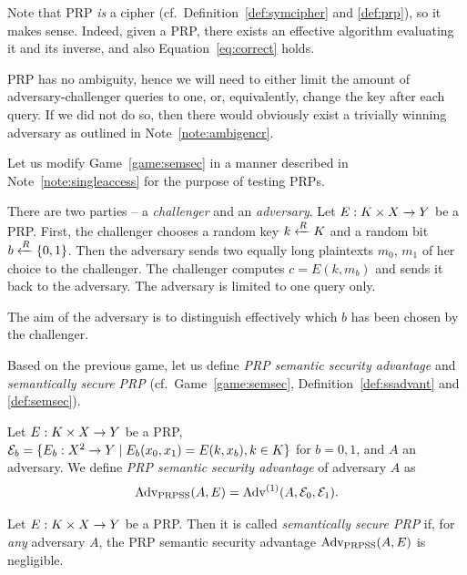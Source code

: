 Note that PRP {\em is} a cipher (cf.\ Definition~\ref{def:symcipher} and \ref{def:prp}), so it makes sense. Indeed, given a PRP, there exists an effective algorithm evaluating it and its inverse, and also Equation~\ref{eq:correct} holds.

\begin{note}   %
\label{note:singleaccess}
	PRP has no ambiguity, hence we will need to either limit the amount of adversary-challenger queries to one, or, equivalently, change the key after each query. If we did not do so, then there would obviously exist a trivially winning adversary as outlined in Note~\ref{note:ambigencr}.
\end{note}

Let us modify Game~\ref{game:semsec} in a manner described in Note~\ref{note:singleaccess} for the purpose of testing PRPs.

\begin{game}
\label{game:semsecprp}
	There are two parties -- a {\em challenger} and an {\em adversary}. Let $E:K\times X\rightarrow Y$ be a PRP. First, the challenger chooses a random key $k\xleftarrow{R} K$ and a random bit $b\xleftarrow{R}\{0,1\}$. Then the adversary sends two equally long plaintexts $m_0$, $m_1$ of her choice to the challenger. The challenger computes $c = E(k,m_b)$ and sends it back to the adversary. The adversary is limited to one query only.
	
	The aim of the adversary is to distinguish effectively which $b$ has been chosen by the challenger.
\end{game}

Based on the previous game, let us define {\em PRP semantic security advantage} and {\em semantically secure PRP} (cf.\ Game~\ref{game:semsec}, Definition~\ref{def:ssadvant} and \ref{def:semsec}). %

\begin{defn}
\label{def:prpssadvant}
	Let $E: K\times X\rightarrow Y$ be a PRP, ${\cal E}_b = \{E_b:X^2\rightarrow Y \mid E_b(x_0,x_1) = E(k,x_b), k\in K\}$ for $b=0,1$, and $A$ an adversary. We define {\em PRP semantic security advantage} of adversary $A$ as
	\[
		\operatorname*{Adv_{PRPSS}}(A,E) = {\operatorname*{Adv}}^{(1)}(A,{\cal E}_0,{\cal E}_1) .
	\]
\end{defn}

\begin{defn}
\label{def:semsecprp}
	Let $E: K\times X\rightarrow Y$ be a PRP. Then it is called {\em semantically secure PRP} if, for {\em any} adversary $A$, the PRP semantic security advantage $\operatorname*{Adv_{PRPSS}}(A,E)$ is negligible.
\end{defn}

